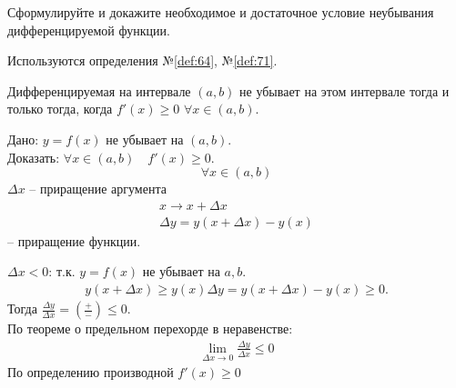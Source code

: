 \begin{question}
    Сформулируйте и докажите необходимое и достаточное условие неубывания дифференцируемой функции.
\end{question}
\begin{used}
    Используются определения №\ref{def:64}, №\ref{def:71}.
\end{used}
\begin{theorem}
    Дифференцируемая на интервале $(a, b)$ не убывает на этом интервале тогда и только тогда, когда  $f'(x) \ge 0$ $\forall x \in (a, b)$.
\end{theorem}
\begin{necessity}
    Дано: $y=f(x)$ не убывает на $(a, b)$. \\
    Доказать:  $\forall x \in (a, b) \quad f'(x) \ge 0$. \[
        \forall x \in (a, b)
    \] 
    $\Delta x$ -- приращение аргумента
    \begin{gather*}
        x \to  x + \Delta x \\
        \Delta  y = y(x + \Delta x) - y(x)
    \end{gather*}
    -- приращение функции.

    $\Delta  x < 0$: 
    т.к. $y = f(x)$ не убывает на  $a, b$.
    \begin{gather*}
        y(x + \Delta x) \ge y(x)
        \Delta  y = y(x + \Delta x) - y(x) \ge 0.
    \end{gather*}
    Тогда $\frac{\Delta y}{\Delta x} = \left( \frac{+}{-} \right) \le 0$. \\

    По теореме о предельном перехорде в неравенстве: 
    \begin{gather*}
        \lim_{\Delta x \to 0} \frac{\Delta y}{\Delta x} \le 0 
    \end{gather*}
    По определению производной $f'(x) \ge 0$
\end{necessity}
